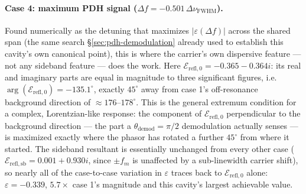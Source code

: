 \documentclass[9pt]{article}
\begin{document}
\paragraph{Case 4: maximum PDH signal
($\Delta f=-0.501\,\Delta\nu_{\mathrm{FWHM}}$).} Found numerically as the
detuning that maximizes $|\varepsilon(\Delta f)|$ across the shared span
(the same search \S\ref{sec:pdh-demodulation} already used to establish
this cavity's own canonical point), this is where the carrier's own
dispersive feature --- not any sideband feature --- does the work. Here
$\mathcal{E}_{\mathrm{refl},0}=-0.365-0.364i$: its real and imaginary parts
are equal in magnitude to three significant figures, i.e.
$\arg(\mathcal{E}_{\mathrm{refl},0})=-135.1^\circ$, exactly $45^\circ$ away
from case 1's off-resonance background direction of
$\approx\!176$--$178^\circ$. This is the general extremum condition for a
complex, Lorentzian-like response: the component of
$\mathcal{E}_{\mathrm{refl},0}$ perpendicular to the background direction
--- the part a $\theta_{\mathrm{demod}}=\pi/2$ demodulation actually senses
--- is maximized exactly where the phasor has rotated a further $45^\circ$
from where it started. The sideband resultant is essentially unchanged from
every other case ($\mathcal{E}_{\mathrm{refl,sb}}=0.001+0.930i$, since
$\pm f_m$ is unaffected by a sub-linewidth carrier shift), so nearly all of
the case-to-case variation in $\varepsilon$ traces back to
$\mathcal{E}_{\mathrm{refl},0}$ alone: $\varepsilon=-0.339$, $5.7\times$
case 1's magnitude and this cavity's largest achievable value.
\end{document}
